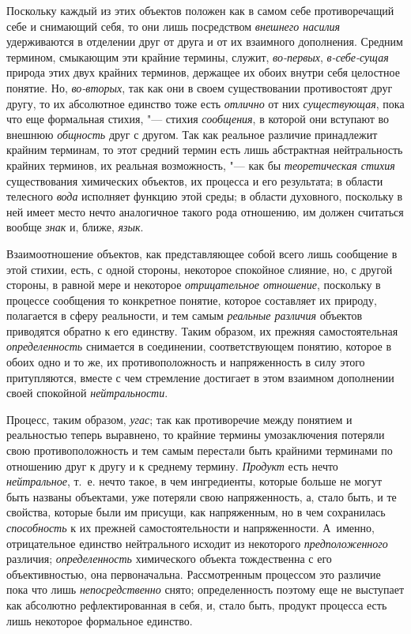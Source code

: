 Поскольку каждый из этих объектов положен как в самом себе
противоречащий себе и снимающий себя, то они лишь посредством
{\em внешнего насилия}
удерживаются в отделении друг от друга и от их
взаимного дополнения. Средним термином, смыкающим эти
крайние термины, служит,
{\em во-первых},
{\em в-себе-сущая} природа
этих двух крайних терминов, держащее их обоих внутри себя целостное
понятие. Но, {\em во-вторых},
так как они в своем существовании противостоят друг другу, то
их абсолютное единство тоже есть
{\em отлично} от них
{\em существующая}, пока
что еще формальная стихия, "--- стихия
{\em сообщения}, в
которой они вступают во внешнюю
{\em общность} друг с
другом. Так как реальное различие принадлежит крайним терминам, то этот
средний термин есть лишь абстрактная нейтральность крайних терминов, их
реальная возможность, "--- как бы
{\em теоретическая стихия}
существования химических объектов, их процесса и его
результата; в области телесного
{\em вода} исполняет
функцию этой среды; в области духовного, поскольку в ней имеет место нечто
аналогичное такого рода отношению, им должен считаться вообще
{\em знак} и, ближе,
{\em язык}.

Взаимоотношение объектов, как представляющее собой всего лишь
сообщение в этой стихии, есть, с одной стороны, некоторое спокойное
слияние, но, с другой стороны, в равной мере и некоторое
{\em отрицательное отношение},
поскольку в процессе сообщения то конкретное понятие, которое
составляет их природу, полагается в сферу реальности, и тем самым
{\em реальные различия}
объектов приводятся обратно к его единству. Таким образом, их
прежняя самостоятельная
{\em определенность}
снимается в соединении, соответствующем понятию, которое в
обоих одно и то же, их противоположность и напряженность в силу этого
притупляются, вместе с чем стремление достигает в этом взаимном дополнении
своей спокойной {\em нейтральности}.

Процесс, таким образом,
{\em угас}; так как
противоречие между понятием и реальностью теперь выравнено, то крайние
термины умозаключения потеряли свою противоположность и тем самым перестали
быть крайними терминами по отношению друг к другу и к среднему термину.
{\em Продукт} есть нечто
{\em нейтральное}, т.~е.
нечто такое, в чем ингредиенты, которые больше не могут быть названы
объектами, уже потеряли свою напряженность, а, стало быть, и те свойства,
которые были им присущи, как напряженным, но в чем сохранилась
{\em способность} к их
прежней самостоятельности и напряженности. А~именно, отрицательное единство
нейтрального исходит из некоторого
{\em предположенного}
различия;
{\em определенность}
химического объекта тождественна с его объективностью, она
первоначальна. Рассмотренным процессом это различие пока что лишь
{\em непосредственно}
снято; определенность поэтому еще не выступает
как абсолютно рефлектированная в себя, и, стало быть, продукт процесса есть
лишь некоторое формальное единство.

